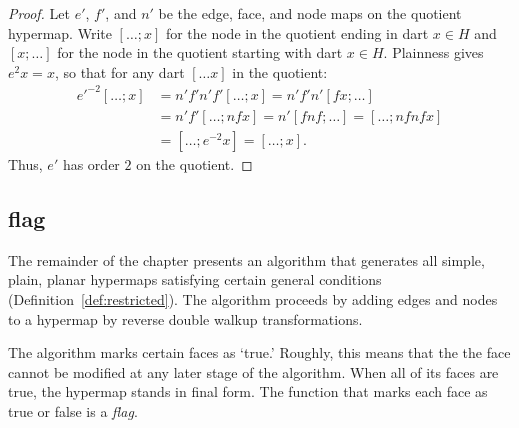 \begin{proof} Let $e'$, $f'$, and $n'$ be the edge, face, and node maps on the
quotient hypermap.  Write $[\ldots; x]$ for the node in the quotient
ending in dart $x\in H$ and $[x;\ldots]$ for the node in the quotient
starting with dart $x\in H$.  Plainness gives $e^2 x = x$, so that for any
dart $[\ldots x]$ in the quotient:
    $$\begin{array}{lll}
    {e'}^{-2} [\ldots; x] &= n' f' n' f' [\ldots; x] = n' f' n' [f x; \ldots] \\&=
    n' f' [\ldots; n f x] = n' [f n f; \ldots] = [\ldots; n f n f x]\\ &=
    [\ldots; e^{-2} x] = [\ldots; x].
    \end{array}$$
Thus, $e'$ has order $2$ on the quotient.
\end{proof}

%


\subsection{flag}

The remainder of the chapter presents an algorithm that
generates all simple, plain, planar hypermaps satisfying certain general
conditions (Definition~\ref{def:restricted}).   The algorithm  proceeds by adding edges and nodes to a hypermap by reverse double walkup transformations.

The algorithm  marks certain faces as `true.'
Roughly, this  means that the the face cannot be modified
at any later stage of the algorithm.   When all of its faces
are true, the hypermap stands in final form.
The function that marks each face as true or false is a
{\it flag}.


